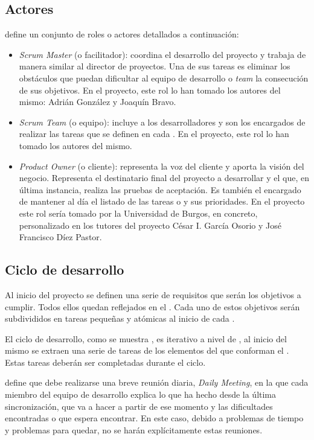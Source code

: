 \subsection{Actores}
\scrum{} define un conjunto de roles o actores detallados a continuación:
\begin{itemize}
 \item \textit{Scrum Master} (o facilitador): coordina el desarrollo del proyecto y trabaja de manera similar al director de proyectos. Una de sus tareas es eliminar los obstáculos que puedan dificultar al equipo de desarrollo o \textit{team} la consecución de sus objetivos. En el proyecto, este rol lo han tomado los autores del mismo: Adrián González y Joaquín Bravo.
 \item \textit{Scrum Team} (o equipo): incluye a los desarrolladores y son los encargados de realizar las tareas que se definen en cada \sprint{}. En el proyecto, este rol lo han tomado los autores del mismo.
 \item \textit{Product Owner} (o cliente): representa la voz del cliente y aporta la visión del negocio. Representa el destinatario final del proyecto a desarrollar y el que, en última instancia, realiza las pruebas de aceptación. Es también el encargado de mantener al día el listado de las tareas o \productbacklog{} y sus prioridades. En el proyecto este rol sería tomado por la Universidad de Burgos, en concreto, personalizado en los tutores del proyecto César I. García Osorio y José Francisco Díez Pastor.
\end{itemize}

\subsection{Ciclo de desarrollo}
Al inicio del proyecto se definen una serie de requisitos que serán los objetivos a cumplir. Todos ellos quedan reflejados en el \productbacklog{}. Cada uno de estos objetivos serán subdivididos en tareas pequeñas y atómicas al inicio de cada \sprint{}.

El ciclo de desarrollo, como se muestra , es iterativo a nivel de \sprint{}, al inicio del mismo se extraen una serie de tareas de los elementos del \productbacklog{} que conforman el \sprintbacklog{}. Estas tareas deberán ser completadas durante el ciclo.


\scrum{} define que debe realizarse una breve reunión diaria, \textit{Daily Meeting}, en la que cada miembro del equipo de desarrollo explica lo que ha hecho desde la última sincronización, que va a hacer a partir de ese momento y las dificultades encontradas o que espera encontrar. En este caso, debido a problemas de tiempo y problemas para quedar, no se harán explícitamente estas reuniones.

